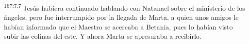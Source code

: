 \par 
\textsuperscript{167:7.7} Jesús hubiera continuado hablando con Natanael sobre el ministerio de los ángeles, pero fue interrumpido por la llegada de Marta, a quien unos amigos le habían informado que el Maestro se acercaba a Betania, pues lo habían visto subir las colinas del este. Y ahora Marta se apresuraba a recibirlo.